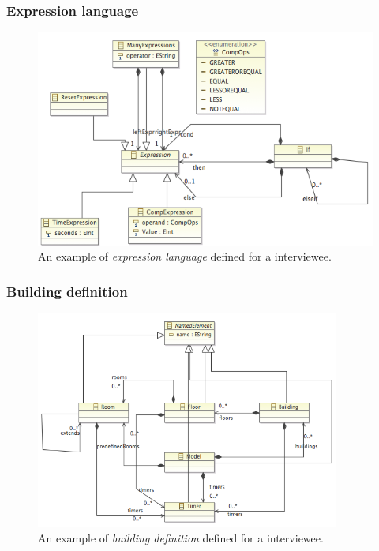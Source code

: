 \documentclass{llncs}
\begin{document}
\subsubsection{Expression language}
\begin{figure}
  \begin{center}
    \includegraphics[scale=0.5]{ecore-expression-language.png}
  \end{center}  
\caption{An example of \textit{expression language} defined for a interviewee.}
\label{fig:ecore-expression-language}
\end{figure}

\subsubsection{Building definition}
\begin{figure}
  \begin{center}
    \includegraphics[width=10cm]{ecore-building-definition.png}
  \end{center}  
\caption{An example of \textit{building definition} defined for a interviewee.}
\label{fig:ecore-building-definition}
\end{figure}
\end{document}
